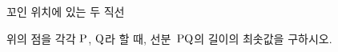 꼬인 위치에 있는 두 직선 \par\smallskip{}\par\smallskip\noindent 위의 점을 각각 $\mathrm{P}$, $\mathrm{Q}$라 할 때, 선분~$\mathrm{PQ}$의 길이의 최솟값을 구하시오.

